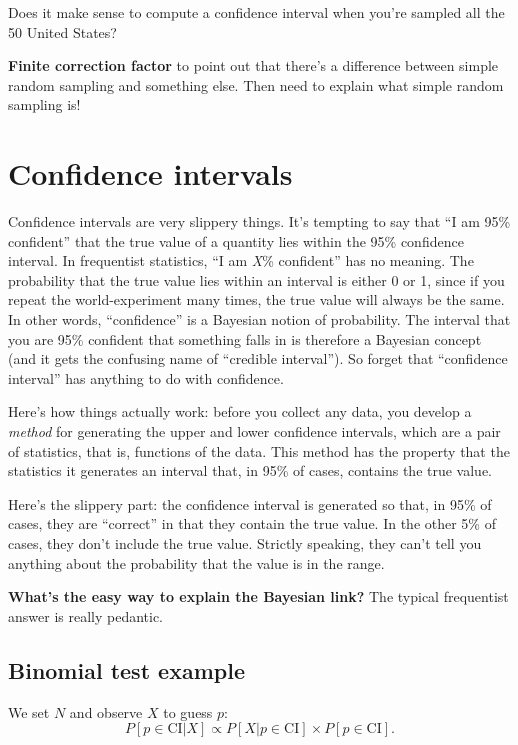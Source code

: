 \documentclass{book}
\begin{document}
Does it make sense to compute a confidence interval when you're sampled
all the 50 United States?

\textbf{Finite correction factor} to point out that there's a difference
between simple random sampling and something else. Then need to explain
what simple random sampling is!

\section{Confidence intervals}\label{confidence-intervals}

Confidence intervals are very slippery things. It's tempting to say that
``I am 95\% confident'' that the true value of a quantity lies within
the 95\% confidence interval. In frequentist statistics, ``I am
\emph{X}\% confident'' has no meaning. The probability that the true
value lies within an interval is either 0 or 1, since if you repeat the
world-experiment many times, the true value will always be the same. In
other words, ``confidence'' is a Bayesian notion of probability. The
interval that you are 95\% confident that something falls in is
therefore a Bayesian concept (and it gets the confusing name of
``credible interval''). So forget that ``confidence interval'' has
anything to do with confidence.

Here's how things actually work: before you collect any data, you
develop a \emph{method} for generating the upper and lower confidence
intervals, which are a pair of statistics, that is, functions of the
data. This method has the property that the statistics it generates an
interval that, in 95\% of cases, contains the true value.

Here's the slippery part: the confidence interval is generated so that,
in 95\% of cases, they are ``correct'' in that they contain the true
value. In the other 5\% of cases, they don't include the true value.
Strictly speaking, they can't tell you anything about the probability
that the value is in the range.

\textbf{What's the easy way to explain the Bayesian link?} The typical
frequentist answer is really pedantic.

\subsection{Binomial test example}\label{binomial-test-example}

We set \(N\) and observe \(X\) to guess \(p\): \[
P[p \in \mathrm{CI} | X] \propto P[X | p \in \mathrm{CI}] \times P[p \in \mathrm{CI}].
\]
\end{document}
